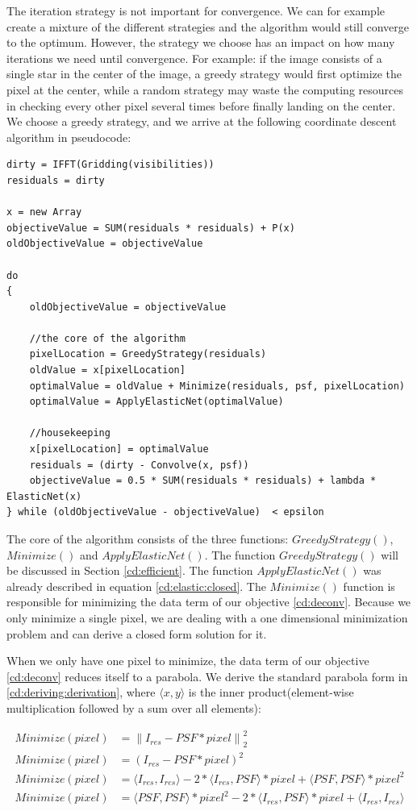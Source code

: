 The iteration strategy is not important for convergence. We can for example create a mixture of the different strategies and the algorithm would still converge to the optimum. However, the strategy we choose has an impact on how many iterations we need until convergence. For example: if the image consists of a single star in the center of the image, a greedy strategy would first optimize the pixel at the center, while a random strategy may waste the computing resources in checking every other pixel several times before finally landing on the center. We choose a greedy strategy, and we arrive at the following coordinate descent algorithm in pseudocode:


\begin{lstlisting}
dirty = IFFT(Gridding(visibilities))
residuals = dirty

x = new Array
objectiveValue = SUM(residuals * residuals) + P(x)
oldObjectiveValue = objectiveValue

do 
{
	oldObjectiveValue = objectiveValue

	//the core of the algorithm
	pixelLocation = GreedyStrategy(residuals)
	oldValue = x[pixelLocation]
	optimalValue = oldValue + Minimize(residuals, psf, pixelLocation)
	optimalValue = ApplyElasticNet(optimalValue)
	
	//housekeeping
	x[pixelLocation] = optimalValue
	residuals = (dirty - Convolve(x, psf))
	objectiveValue = 0.5 * SUM(residuals * residuals) + lambda * ElasticNet(x)
} while (oldObjectiveValue - objectiveValue)  < epsilon
\end{lstlisting}

The core of the algorithm consists of the three functions: $GreedyStrategy()$, $Minimize()$ and $ApplyElasticNet()$. The function $GreedyStrategy()$ will be discussed in Section \ref{cd:efficient}. The function $ApplyElasticNet()$ was already described in equation \eqref{cd:elastic:closed}. The $Minimize()$ function is responsible for minimizing the data term of our objective \eqref{cd:deconv}. Because we only minimize a single pixel, we are dealing with a one dimensional minimization problem and can derive a closed form solution for it.

When we only have one pixel to minimize, the data term of our objective \eqref{cd:deconv} reduces itself to a parabola. We derive the standard parabola form in \eqref{cd:deriving:derivation}, where $\langle x, y\rangle$ is the inner product(element-wise multiplication followed by a sum over all elements):

\begin{equation} \label{cd:deriving:derivation}
\begin{split}
Minimize(pixel) & = \left \| I_{res} - PSF * pixel \right \|_2^2\\
Minimize(pixel) & = (I_{res} - PSF * pixel)^2\\
Minimize(pixel) & = \langle I_{res}, I_{res} \rangle - 2*\langle I_{res},PSF\rangle * pixel + \langle PSF, PSF \rangle * pixel^2\\
Minimize(pixel) & = \langle PSF, PSF \rangle * pixel^2 - 2*\langle I_{res},PSF\rangle * pixel + \langle I_{res}, I_{res} \rangle
\end{split}
\end{equation}

